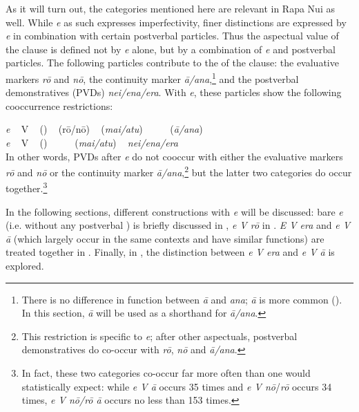 As it will turn out, the categories mentioned here are relevant in Rapa Nui as well. While \textit{e} as such expresses imperfectivity, finer distinctions are expressed by \textit{e} in combination with certain postverbal particles. Thus the aspectual value of the clause is defined not by \textit{e} alone, but by a combination of \textit{e} and postverbal particles. The following particles contribute to the  of the clause: the evaluative markers \textit{rō} and \textit{nō}, the continuity marker \textit{{\ꞌ}ā/{\ꞌ}ana},\footnote{\label{fn:323}There is no difference in function between \textit{{\ꞌ}ā} and \textit{{\ꞌ}ana}; \textit{{\ꞌ}ā} is more common (). In this section, \textit{{\ꞌ}ā} will be used as a shorthand for \textit{{\ꞌ}ā/{\ꞌ}ana}.}  and the postverbal demonstratives (PVDs) \textit{nei/ena/era}. With \textit{e}, these particles show the following cooccurrence restrictions:

\ea\label{ex:7.26a}
\gll
\textit{e} ~ \textup{V} ~ \textup{()} ~ \textup{(}rō/nō\textup{)} ~ \textup{(}\textit{mai/atu}\textup{)} ~ ~ ~  \textup{(}\textit{{\ꞌ}ā/{\ꞌ}ana}\textup{)}\\
\textit{e} ~ V ~ \textup{()} ~ ~ ~  (\textit{mai/atu}) ~ \textit{nei/ena/era}\\
\z
In other words, PVDs after \textit{e} do not cooccur with either the evaluative markers \textit{rō} and \textit{nō} or the continuity marker \textit{{\ꞌ}ā/{\ꞌ}ana},\footnote{\label{fn:324}This restriction is specific to  \textit{e}; after other aspectuals, postverbal demonstratives do co-occur with \textit{rō}, \textit{nō} and \textit{{\ꞌ}ā/{\ꞌ}ana}.} but the latter two categories do occur together.\footnote{\label{fn:325}In fact, these two categories co-occur far more often than one would statistically expect: while \textit{e V {\ꞌ}ā} occurs 35 times and \textit{e V nō}/\textit{rō} occurs 34 times, \textit{e V nō/rō {\ꞌ}ā} occurs no less than 153 times.} 

In the following sections, different constructions with \textit{e} will be discussed: bare \textit{e} (i.e. without any postverbal ) is briefly discussed in , \textit{e V rō} in . \textit{E V era} and \textit{e V {\ꞌ}ā} (which largely occur in the same contexts and have similar functions) are treated together in . Finally, in , the distinction between \textit{e V era} and \textit{e V {\ꞌ}ā} is explored.

